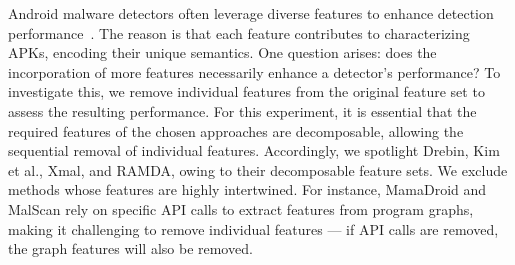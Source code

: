




Android malware detectors often leverage diverse features to enhance detection performance~\cite{arp2014drebin,kim2018multimodal,li2021robust}.
The reason is that each feature contributes to characterizing APKs, encoding their unique semantics.
One question arises: does the incorporation of more features necessarily enhance a detector's performance?
To investigate this, we remove individual features from the original feature set to assess the resulting performance.
For this experiment, it is essential that the required features of the chosen approaches are decomposable, allowing the sequential removal of individual features.
Accordingly, we spotlight Drebin, Kim et al., Xmal, and RAMDA, owing to their decomposable feature sets.
We exclude methods whose features are highly intertwined.
For instance, MamaDroid and MalScan rely on specific API calls to extract features from program graphs, making it challenging to remove individual features --- if API calls are removed, the graph features will also be removed.

